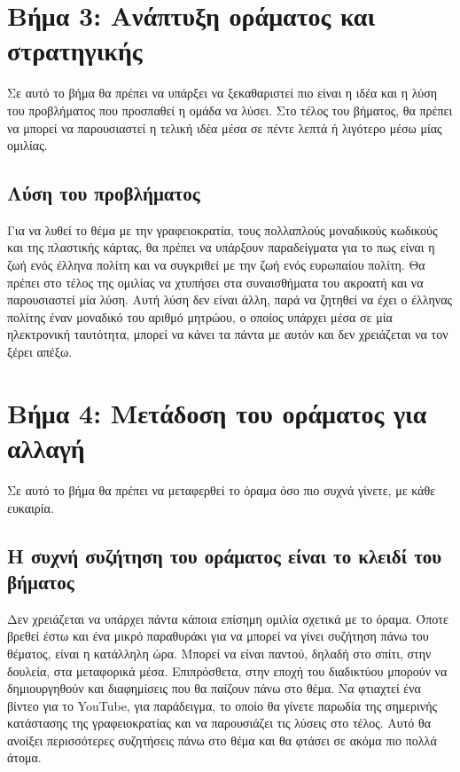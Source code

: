 \documentclass{fphw}
\begin{document}
    \section*{Βήμα 3: Ανάπτυξη οράματος και στρατηγικής}

    \begin{problem}
        Σε αυτό το βήμα θα πρέπει να υπάρξει να ξεκαθαριστεί πιο είναι η ιδέα και η λύση του προβλήματος
        που προσπαθεί η ομάδα να λύσει. Στο τέλος του βήματος, θα πρέπει να μπορεί να παρουσιαστεί η τελική ιδέα μέσα σε πέντε λεπτά
        ή λιγότερο μέσω μίας ομιλίας.
    \end{problem}

    \subsection*{Λύση του προβλήματος}
    Για να λυθεί το θέμα με την γραφειοκρατία, τους πολλαπλούς μοναδικούς κωδικούς και της πλαστικής κάρτας, 
    θα πρέπει να υπάρξουν παραδείγματα για το πως είναι η ζωή ενός έλληνα πολίτη και να συγκριθεί με την ζωή ενός
    ευρωπαίου πολίτη. Θα πρέπει στο τέλος της ομιλίας να χτυπήσει στα συναισθήματα του ακροατή και να παρουσιαστεί μία λύση.
    Αυτή λύση δεν είναι άλλη, παρά να ζητηθεί να έχει ο έλληνας πολίτης έναν μοναδικό του αριθμό μητρώου, ο οποίος υπάρχει
    μέσα σε μία ηλεκτρονική ταυτότητα, μπορεί να κάνει τα πάντα με αυτόν και δεν χρειάζεται να τον ξέρει απέξω.
    
    \section*{Βήμα 4: Μετάδοση του οράματος για αλλαγή}

    \begin{problem}
        Σε αυτό το βήμα θα πρέπει να μεταφερθεί το όραμα όσο πιο συχνά γίνετε, με κάθε ευκαιρία.
    \end{problem}

    \subsection*{Η συχνή συζήτηση του οράματος είναι το κλειδί του βήματος}
    Δεν χρειάζεται να υπάρχει πάντα κάποια επίσημη ομιλία σχετικά με το όραμα. Όποτε βρεθεί έστω και ένα μικρό παραθυράκι
    για να μπορεί να γίνει συζήτηση πάνω του θέματος, είναι η κατάλληλη ώρα. Μπορεί να είναι παντού, δηλαδή στο σπίτι, στην δουλεία,
    στα μεταφορικά μέσα. Επιπρόσθετα, στην εποχή του διαδικτύου μπορούν να δημιουργηθούν και διαφημίσεις που θα παίζουν πάνω στο θέμα.
    Να φτιαχτεί ένα βίντεο για το YouTube, για παράδειγμα, το οποίο θα γίνετε παρωδία της σημερινής κατάστασης της γραφειοκρατίας και να
    παρουσιάζει τις λύσεις στο τέλος. Αυτό θα ανοίξει περισσότερες συζητήσεις πάνω στο θέμα και θα φτάσει σε ακόμα πιο πολλά άτομα.
\end{document}
